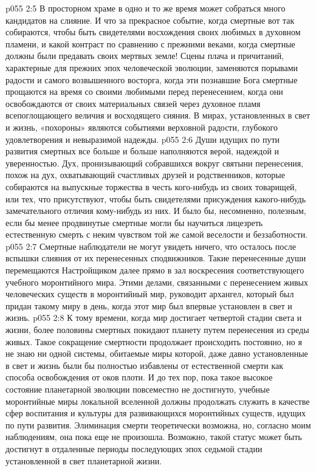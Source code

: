 \vs p055 2:5 В просторном храме в одно и то же время может собраться много кандидатов на слияние. И что за прекрасное событие, когда смертные вот так собираются, чтобы быть свидетелями восхождения своих любимых в духовном пламени, и какой контраст по сравнению с прежними веками, когда смертные должны были предавать своих мертвых земле! Сцены плача и причитаний, характерные для прежних эпох человеческой эволюции, заменяются порывами радости и самого возвышенного восторга, когда эти познавшие Бога смертные прощаются на время со своими любимыми перед перенесением, когда они освобождаются от своих материальных связей через духовное пламя всепоглощающего величия и восходящего сияния. В мирах, установленных в свет и жизнь, «похороны» являются событиями верховной радости, глубокого удовлетворения и невыразимой надежды.
\vs p055 2:6 Души идущих по пути развития смертных все больше и больше наполняются верой, надеждой и уверенностью. Дух, пронизывающий собравшихся вокруг святыни перенесения, похож на дух, охватывающий счастливых друзей и родственников, которые собираются на выпускные торжества в честь кого\hyp{}нибудь из своих товарищей, или тех, что присутствуют, чтобы быть свидетелями присуждения какого\hyp{}нибудь замечательного отличия кому\hyp{}нибудь из них. И было бы, несомненно, полезным, если бы менее продвинутые смертные могли бы научиться лицезреть естественную смерть с неким чувством той же самой веселости и беззаботности.
\vs p055 2:7 \pc Смертные наблюдатели не могут увидеть ничего, что осталось после вспышки слияния от их перенесенных сподвижников. Такие перенесенные души перемещаются Настройщиком далее прямо в зал воскресения соответствующего учебного моронтийного мира. Этими делами, связанными с перенесением живых человеческих существ в моронтийный мир, руководит архангел, который был придан такому миру в день, когда этот мир был впервые установлен в свет и жизнь.
\vs p055 2:8 К тому времени, когда мир достигает четвертой стадии света и жизни, более половины смертных покидают планету путем перенесения из среды живых. Такое сокращение смертности продолжает происходить постоянно, но я не знаю ни одной системы, обитаемые миры которой, даже давно установленные в свет и жизнь были бы полностью избавлены от естественной смерти как способа освобождения от оков плоти. И до тех пор, пока такое высокое состояние планетарной эволюции повсеместно не достигнуто, учебные моронтийные миры локальной вселенной должны продолжать служить в качестве сфер воспитания и культуры для развивающихся моронтийных существ, идущих по пути развития. Элиминация смерти теоретически возможна, но, согласно моим наблюдениям, она пока еще не произошла. Возможно, такой статус может быть достигнут в отдаленные периоды последующих эпох седьмой стадии установленной в свет планетарной жизни.
